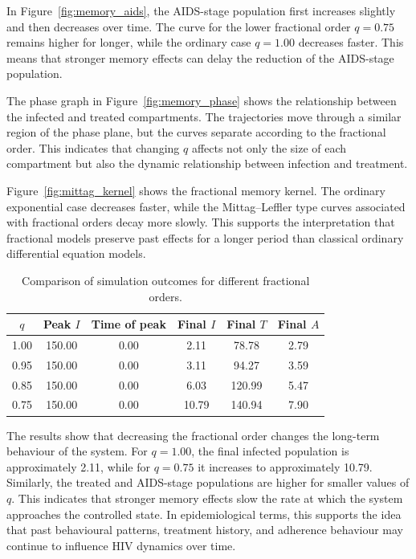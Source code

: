 \documentclass[12pt,a4paper,oneside]{report}
\begin{document}
In Figure~\ref{fig:memory_aids}, the AIDS-stage population first increases slightly and then decreases over time. The curve for the lower fractional order $q=0.75$ remains higher for longer, while the ordinary case $q=1.00$ decreases faster. This means that stronger memory effects can delay the reduction of the AIDS-stage population.

The phase graph in Figure~\ref{fig:memory_phase} shows the relationship between the infected and treated compartments. The trajectories move through a similar region of the phase plane, but the curves separate according to the fractional order. This indicates that changing $q$ affects not only the size of each compartment but also the dynamic relationship between infection and treatment.

Figure~\ref{fig:mittag_kernel} shows the fractional memory kernel. The ordinary exponential case decreases faster, while the Mittag--Leffler type curves associated with fractional orders decay more slowly. This supports the interpretation that fractional models preserve past effects for a longer period than classical ordinary differential equation models.

\begin{table}[H]
\centering
\caption{Comparison of simulation outcomes for different fractional orders.}
\label{tab:memory_results}
\begin{tabular}{cccccc}
\toprule
$q$ & Peak $I$ & Time of peak & Final $I$ & Final $T$ & Final $A$\\
\midrule
1.00 & 150.00 & 0.00 & 2.11 & 78.78 & 2.79\\
0.95 & 150.00 & 0.00 & 3.11 & 94.27 & 3.59\\
0.85 & 150.00 & 0.00 & 6.03 & 120.99 & 5.47\\
0.75 & 150.00 & 0.00 & 10.79 & 140.94 & 7.90\\
\bottomrule
\end{tabular}
\end{table}

The results show that decreasing the fractional order changes the long-term behaviour of the system. For $q=1.00$, the final infected population is approximately 2.11, while for $q=0.75$ it increases to approximately 10.79. Similarly, the treated and AIDS-stage populations are higher for smaller values of $q$. This indicates that stronger memory effects slow the rate at which the system approaches the controlled state. In epidemiological terms, this supports the idea that past behavioural patterns, treatment history, and adherence behaviour may continue to influence HIV dynamics over time.
\end{document}
